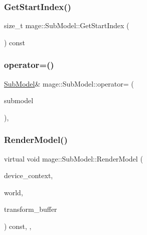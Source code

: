 \hypertarget{classmage_1_1_sub_model_a2b901cb62dca26a7ff399719e0a4ba66}{}\label{classmage_1_1_sub_model_a2b901cb62dca26a7ff399719e0a4ba66} 
\subsubsection{\texorpdfstring{Get\+Start\+Index()}{GetStartIndex()}}
{\footnotesize\ttfamily size\+\_\+t mage\+::\+Sub\+Model\+::\+Get\+Start\+Index (\begin{DoxyParamCaption}{ }\end{DoxyParamCaption}) const}

\hypertarget{classmage_1_1_sub_model_aafc8b4ba509ec78ea36719e98b1a0c99}{}\label{classmage_1_1_sub_model_aafc8b4ba509ec78ea36719e98b1a0c99} 
\subsubsection{\texorpdfstring{operator=()}{operator=()}}
{\footnotesize\ttfamily \hyperlink{classmage_1_1_sub_model}{Sub\+Model}\& mage\+::\+Sub\+Model\+::operator= (\begin{DoxyParamCaption}\item[{const \hyperlink{classmage_1_1_sub_model}{Sub\+Model} \&}]{submodel }\end{DoxyParamCaption})\hspace{0.3cm}{\ttfamily [private]}, {\ttfamily [delete]}}

\hypertarget{classmage_1_1_sub_model_a8f5b7ce6498df58d44dd41cc3c42267b}{}\label{classmage_1_1_sub_model_a8f5b7ce6498df58d44dd41cc3c42267b} 
\subsubsection{\texorpdfstring{Render\+Model()}{RenderModel()}}
{\footnotesize\ttfamily virtual void mage\+::\+Sub\+Model\+::\+Render\+Model (\begin{DoxyParamCaption}\item[{\hyperlink{namespacemage_ae74f374780900893caa5555d1031fd79}{Com\+Ptr}$<$ I\+D3\+D11\+Device\+Context2 $>$}]{device\+\_\+context,  }\item[{const \hyperlink{classmage_1_1_world}{World} \&}]{world,  }\item[{const \hyperlink{structmage_1_1_transform_buffer}{Transform\+Buffer} \&}]{transform\+\_\+buffer }\end{DoxyParamCaption}) const\hspace{0.3cm}{\ttfamily [override]}, {\ttfamily [protected]}, {\ttfamily [virtual]}}



